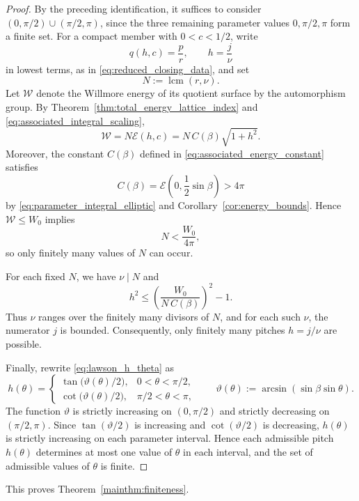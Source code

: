\documentclass[a4paper,11pt]{amsart}
\numberwithin{equation}{section}
\theoremstyle{plain}
\begin{document}
\begin{proof}
By the preceding identification, it suffices to consider
$(0,\pi/2)\cup(\pi/2,\pi)$, since the three remaining parameter values
$0,\pi/2,\pi$ form a finite set. For a compact member with $0<c<1/2$, write
\[
q(h,c)=\frac{p}{r},
\qquad
h=\frac{j}{\nu}
\]
in lowest terms, as in \eqref{eq:reduced_closing_data}, and set
\[
    N:=\operatorname{lcm}(r,\nu).
\]
Let $\mathcal W$ denote the Willmore energy of its quotient surface by the
automorphism group. By
Theorem~\ref{thm:total_energy_lattice_index} and
\eqref{eq:associated_integral_scaling},
\[
    \mathcal W
    =N\mathcal E(h,c)
    =N\,C(\beta)\sqrt{1+h^2}.
\]
Moreover, the constant $C(\beta)$ defined in
\eqref{eq:associated_energy_constant} satisfies
\[
    C(\beta)
    =\mathcal E\left(0,\frac12\sin\beta\right)>4\pi
\]
by \eqref{eq:parameter_integral_elliptic} and
Corollary~\ref{cor:energy_bounds}. Hence $\mathcal W\le W_0$ implies
\[
    N<\frac{W_0}{4\pi},
\]
so only finitely many values of $N$ can occur.

For each fixed $N$, we have $\nu\mid N$ and
\[
    h^2
    \le
    \left(\frac{W_0}{N\,C(\beta)}\right)^2-1.
\]
Thus $\nu$ ranges over the finitely many divisors of $N$, and for each
such $\nu$, the numerator $j$ is bounded. Consequently, only finitely
many pitches $h=j/\nu$ are possible.

Finally, rewrite \eqref{eq:lawson_h_theta} as
\[
    h(\theta)=
    \begin{cases}
    \tan\bigl(\vartheta(\theta)/2\bigr),&0<\theta<\pi/2,\\[4pt]
    \cot\bigl(\vartheta(\theta)/2\bigr),&\pi/2<\theta<\pi,
    \end{cases}
    \qquad
    \vartheta(\theta):=\arcsin(\sin\beta\sin\theta).
\]
The function $\vartheta$ is strictly increasing on $(0,\pi/2)$ and strictly
decreasing on $(\pi/2,\pi)$. Since $\tan(\vartheta/2)$ is increasing and
$\cot(\vartheta/2)$ is decreasing, $h(\theta)$ is strictly increasing on each
parameter interval. Hence each admissible pitch $h(\theta)$ determines at most one
value of $\theta$ in each interval, and the set of admissible values of
$\theta$ is finite.
\end{proof}

This proves Theorem~\ref{mainthm:finiteness}.
\end{document}
